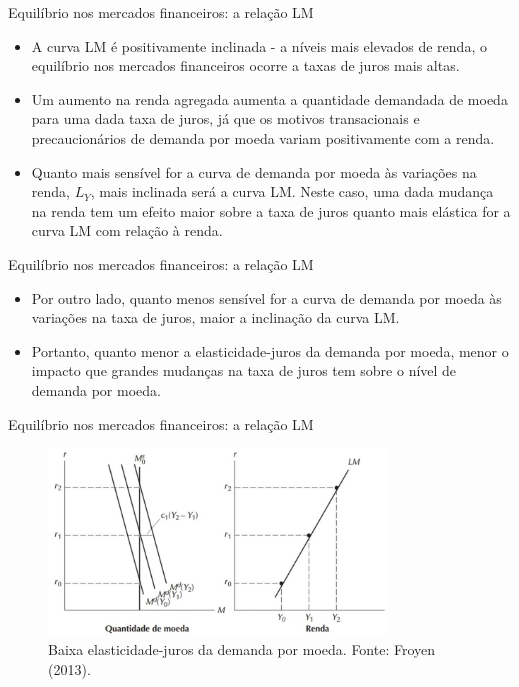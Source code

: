 \documentclass[10pt]{beamer}
\begin{document}
\begin{frame}{Equilíbrio nos mercados financeiros: a relação LM}
\begin{itemize}
    \item A curva LM é positivamente inclinada - a níveis mais elevados de renda, o equilíbrio nos mercados financeiros ocorre a taxas de juros mais altas.
    \bigskip
    \item Um aumento na renda agregada aumenta a quantidade demandada de moeda para uma dada taxa de juros, já que os motivos transacionais e precaucionários de demanda por moeda variam positivamente com a renda.
    \bigskip
    \item Quanto mais sensível for a curva de demanda por moeda às variações na renda, $L_Y$, mais inclinada será a curva LM. Neste caso, uma dada mudança na renda tem um efeito maior sobre a taxa de juros quanto mais elástica for a curva LM com relação à renda.
\end{itemize}
\end{frame}

\begin{frame}{Equilíbrio nos mercados financeiros: a relação LM}
\begin{itemize}
    \item Por outro lado, quanto menos sensível for a curva de demanda por moeda às variações na taxa de juros, maior a inclinação da curva LM.
    \bigskip
    \item Portanto, quanto menor a elasticidade-juros da demanda por moeda, menor o impacto que grandes mudanças na taxa de juros tem sobre o nível de demanda por moeda.
\end{itemize}
\end{frame}

\begin{frame}{Equilíbrio nos mercados financeiros: a relação LM}
\begin{figure}
    \centering
    \includegraphics[width=0.8\textwidth]{./figures/aula092_fig4.JPG}
    \caption{Baixa elasticidade-juros da demanda por moeda. Fonte: Froyen (2013).}
    \label{fig4}
\end{figure}
\end{frame}
\end{document}
